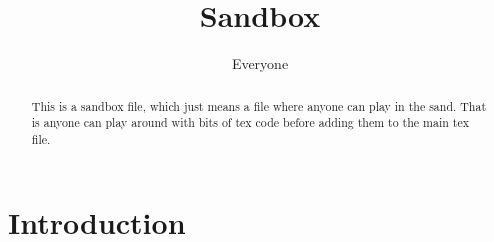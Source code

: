 \documentclass{article}
\title{Sandbox}
\author{Everyone}
\begin{document}
\maketitle

\begin{abstract}
    This is a sandbox file, which just means a file where anyone can play in the sand. That is anyone can play around with bits of tex code before adding them to the main tex file. 
\end{abstract}

\section{Introduction}
\end{document}
